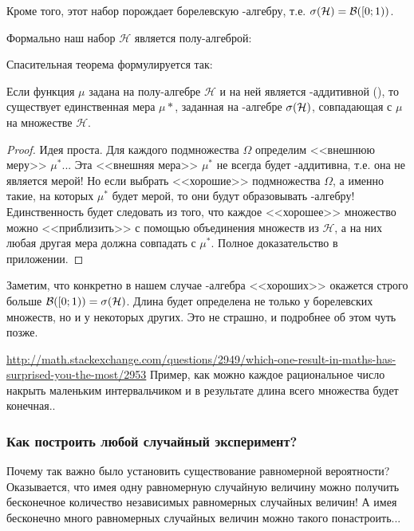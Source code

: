 {Кроме того, этот набор порождает борелевскую \s-алгебру, т.е. $\sigma(\mathcal{H})=\mathcal{B} ([0;1))$.

Формально наш набор $\mathcal{H}$ является полу-алгеброй:

\begin{mydef}

\end{mydef}

Спасительная теорема формулируется так:

\begin{myth}[Каратеодори]
Если функция $\mu$ задана на полу-алгебре $\mathcal{H}$ и на ней является \s-аддитивной (), то существует единственная мера $\mu{*}$, заданная на \s-алгебре $\sigma(\mathcal{H})$, совпадающая с $\mu$ на множестве $\mathcal{H}$.
\end{myth}

\begin{proof} Идея проста. Для каждого подмножества $\Omega$ определим <<внешнюю меру>> $\mu^{*}$... Эта <<внешняя мера>> $\mu^{*}$ не всегда будет \s-аддитивна, т.е. она не является мерой! Но если выбрать <<хорошие>> подмножества $\Omega$, а именно такие, на которых $\mu^{*}$ будет мерой, то они будут образовывать \s-алгебру! Единственность будет следовать из того, что каждое <<хорошее>> множество можно <<приблизить>> с помощью объединения множеств из $\mathcal{H}$, а на них любая другая мера должна совпадать с $\mu^{*}$. Полное доказательство в приложении.
\end{proof}
Заметим, что конкретно в нашем случае \s-алгебра <<хороших>> окажется строго больше $\mathcal{B}([0;1))=\sigma(\mathcal{H})$. Длина будет определена не только у борелевских множеств, но и у некоторых других. Это не страшно, и подробнее об этом чуть позже.


\begin{myex}
\url{http://math.stackexchange.com/questions/2949/which-one-result-in-maths-has-surprised-you-the-most/2953}
Пример, как можно каждое рациональное число накрыть маленьким интервальчиком и в результате длина всего множества будет конечная..
\end{myex}




\subsubsection*{Как построить любой случайный эксперимент?}

Почему так важно было установить существование равномерной вероятности? Оказывается, что имея одну равномерную случайную величину можно получить бесконечное количество независимых равномерных случайных величин! А имея бесконечно много равномерных случайных величин можно такого понастроить...

}
